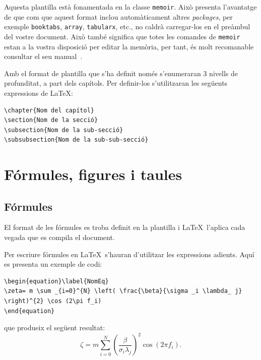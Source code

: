 Aquesta plantilla està fonamentada en la classe \texttt{memoir}. Això presenta l'avantatge de que com que aquest format inclou automàticament altres \emph{packages}, per exemple \texttt{booktabs},
\texttt{array}, \texttt{tabularx}, etc., no caldrà carregar-los en el preàmbul del vostre document. Això també significa que totes les comandes de \texttt{memoir} estan a la vostra disposició per editar la memòria, per tant, és molt recomanable consultar el seu manual~\cite{Wil10}.

Amb el format de plantilla que s'ha definit només s'enumeraran 3 nivells de profunditat, a part dels capítols. Per definir-los s'utilitzaran les
següents expressions de \LaTeX:

\begin{verbatim}
\chapter{Nom del capítol}
\section{Nom de la secció}
\subsection{Nom de la sub-secció}
\subsubsection{Nom de la sub-sub-secció}
\end{verbatim}

\section{Fórmules, figures i taules}
\subsection{Fórmules}

El format de les fórmules es troba definit en la plantilla i \LaTeX\ l'aplica cada vegada que es compila el document.

Per escriure fórmules en \LaTeX\ s'hauran d'utilitzar les expressions adients. Aquí es presenta un exemple de codi:
\begin{verbatim}
\begin{equation}\label{NomEq}
\zeta= m \sum _{i=0}^{N} \left( \frac{\beta}{\sigma _i \lambda_ j}
\right)^{2} \cos (2\pi f_i)
\end{equation}
\end{verbatim}
que produeix el següent resultat:
\begin{equation}\label{NomEq}
\zeta= m \sum _{i=0}^{N} \left( \frac{\beta}{\sigma _i \lambda_ j}\right)^{2} \cos (2\pi f_i).
\end{equation}

